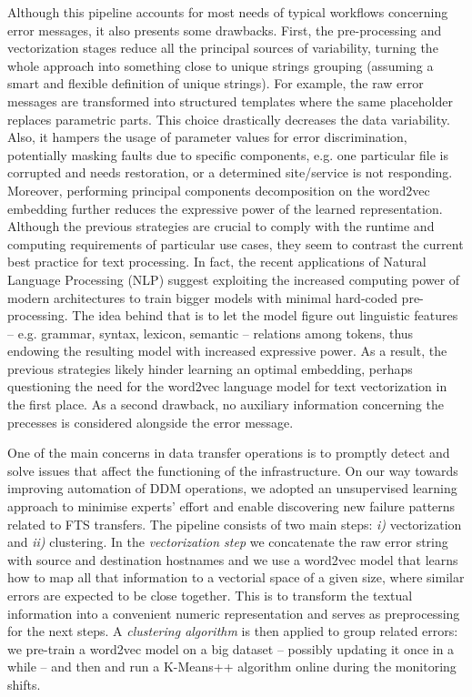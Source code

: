Although this pipeline accounts for most needs of typical workflows concerning error messages, it also presents some drawbacks.
First, the pre-processing and vectorization stages reduce all the principal sources of variability, turning the whole approach into something close to unique strings grouping (assuming a smart and flexible definition of unique strings). 
For example,  the raw error messages are transformed into structured templates where the same placeholder replaces parametric parts.
This choice drastically decreases the data variability. Also, it hampers the usage of parameter values for error discrimination, potentially masking faults due to specific components, e.g. one particular file is corrupted and needs restoration, or a determined site/service is not responding.
Moreover, performing principal components decomposition on the word2vec embedding further reduces the expressive power of the learned representation.
Although the previous strategies are crucial to comply with the runtime and computing requirements of particular use cases, they seem to contrast the current best practice for text processing. 
In fact,  the recent applications of Natural Language Processing (NLP) suggest exploiting the increased computing power of modern architectures to train bigger models with minimal hard-coded pre-processing. 
The idea behind that is to let the model figure out linguistic features -- e.g. grammar, syntax, lexicon, semantic -- relations among tokens, thus endowing the resulting model with increased expressive power.
As a result, the previous strategies likely hinder learning an optimal embedding, perhaps questioning the need for the word2vec language model for text vectorization in the first place.
As a second drawback, no auxiliary information concerning the precesses is considered alongside the error message. 

One of the main concerns in data transfer operations is to promptly detect and solve issues that affect the functioning of the infrastructure.
On our way towards improving automation of DDM operations, we adopted an unsupervised learning approach to minimise experts' effort and enable discovering new failure patterns related to FTS transfers. 
The pipeline consists of 
two main steps: \textit{i)} vectorization and \textit{ii)} clustering.
In the {\emph{vectorization step}} we concatenate the raw error string with source and destination hostnames and we use a word2vec model that learns how to map all that information to a vectorial space of a given size, where similar errors are expected to be close together. This is to transform the textual information into a convenient numeric representation and serves as preprocessing for the next steps. 
A {\emph{clustering algorithm}} is then applied to group related errors: 
we pre-train a word2vec model on a big dataset 
-- possibly updating it once in a while -- and then 
and run a \mbox{K-Means++} algorithm \cite{kmeans} online during the monitoring shifts.  
% 

